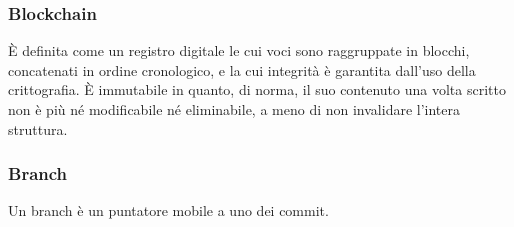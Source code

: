 \subsubsection*{Blockchain}
È definita come un registro digitale le cui voci sono raggruppate in blocchi, concatenati in ordine cronologico, e la cui integrità è garantita dall’uso della crittografia. È immutabile in quanto, di norma, il suo contenuto una volta scritto non è più né modificabile né eliminabile, a meno di non invalidare l’intera struttura.
\subsubsection*{Branch}
Un branch è un puntatore mobile a uno dei commit.
